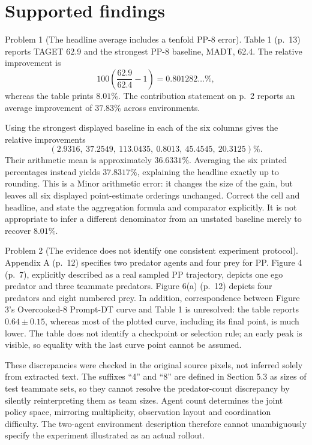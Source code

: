 \documentclass[10pt]{article}
\begin{document}
\section*{Supported findings}
Problem 1 (The headline average includes a tenfold PP-8 error).  Table 1 (p. 13) reports TAGET 62.9 and the strongest PP-8 baseline, MADT, 62.4. The relative improvement is \[100\left(\frac{62.9}{62.4}-1\right)=0.801282\ldots\%,\] whereas the table prints \(8.01\%\). The contribution statement on p. 2 reports an average improvement of \(37.83\%\) across environments.\par
Using the strongest displayed baseline in each of the six columns gives the relative improvements \[(2.9316,\ 37.2549,\ 113.0435,\ 0.8013,\ 45.4545,\ 20.3125)\%.\] Their arithmetic mean is approximately \(36.6331\%\). Averaging the six printed percentages instead yields \(37.8317\%\), explaining the headline exactly up to rounding. This is a Minor arithmetic error: it changes the size of the gain, but leaves all six displayed point-estimate orderings unchanged. Correct the cell and headline, and state the aggregation formula and comparator explicitly. It is not appropriate to infer a different denominator from an unstated baseline merely to recover \(8.01\%\).\par
Problem 2 (The evidence does not identify one consistent experiment protocol).  Appendix A (p. 12) specifies two predator agents and four prey for PP. Figure 4 (p. 7), explicitly described as a real sampled PP trajectory, depicts one ego predator and three teammate predators. Figure 6(a) (p. 12) depicts four predators and eight numbered prey. In addition, correspondence between Figure 3’s Overcooked-8 Prompt-DT curve and Table 1 is unresolved: the table reports \(0.64\pm0.15\), whereas most of the plotted curve, including its final point, is much lower. The table does not identify a checkpoint or selection rule; an early peak is visible, so equality with the last curve point cannot be assumed.\par
These discrepancies were checked in the original source pixels, not inferred solely from extracted text. The suffixes “4” and “8” are defined in Section 5.3 as sizes of test teammate sets, so they cannot resolve the predator-count discrepancy by silently reinterpreting them as team sizes. Agent count determines the joint policy space, mirroring multiplicity, observation layout and coordination difficulty. The two-agent environment description therefore cannot unambiguously specify the experiment illustrated as an actual rollout.\par
\end{document}
